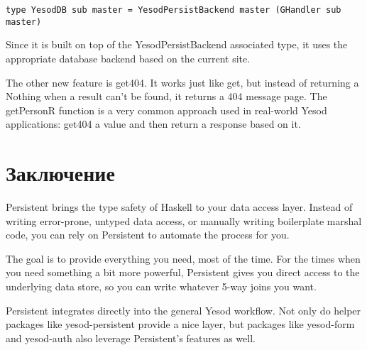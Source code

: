 \begin{lstlisting}
type YesodDB sub master = YesodPersistBackend master (GHandler sub master)
\end{lstlisting}

Since it is built on top of the YesodPersistBackend associated type, it uses the appropriate database backend based on the current site.

The other new feature is get404. It works just like get, but instead of returning a Nothing when a result can't be found, it returns a 404 message page. The getPersonR function is a very common approach used in real-world Yesod applications: get404 a value and then return a response based on it.

\section{Заключение} %

Persistent brings the type safety of Haskell to your data access layer. Instead of writing error-prone, untyped data access, or manually writing boilerplate marshal code, you can rely on Persistent to automate the process for you.

The goal is to provide everything you need, most of the time. For the times when you need something a bit more powerful, Persistent gives you direct access to the underlying data store, so you can write whatever 5-way joins you want.

Persistent integrates directly into the general Yesod workflow. Not only do helper packages like yesod-persistent provide a nice layer, but packages like yesod-form and yesod-auth also leverage Persistent's features as well.
